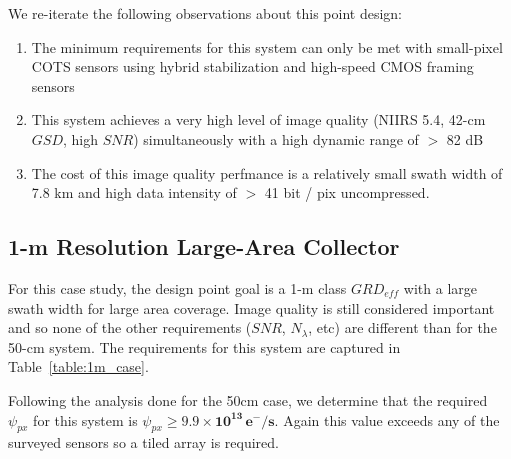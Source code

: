 \documentclass[10pt,journal]{IEEEtran}  %
\begin{document}
We re-iterate the following observations about this point design:

\begin{enumerate}
    \item The minimum requirements for this system can only be met with small-pixel COTS sensors using hybrid stabilization and high-speed CMOS framing sensors
    \item This system achieves a very high level of image quality (NIIRS 5.4, 42-cm $GSD$, high $SNR$) simultaneously with a high dynamic range of $>$ 82 dB
    \item The cost of this image quality perfmance is a relatively small swath width of 7.8 km and high data intensity of $>$ 41 bit / pix uncompressed.
\end{enumerate}

\subsection{1-m Resolution Large-Area Collector}

For this case study, the design point goal is a 1-m class $GRD_{eff}$ with a large swath width for large area coverage.  Image quality is still considered important and so none of the other requirements ($SNR$, $N_\lambda$, etc) are different than for the 50-cm system.  The requirements for this system are captured in Table~\ref{table:1m_case}. 

\begin{table}[h!]
\centering
{}
\caption{Specification for 1-m large-area collector.}
\label{table:1m_case}
\end{table}

Following the analysis done for the 50cm case, we determine that the required $\psi_{px}$ for this system is $\psi_{px} \geq \mathbf{9.9 \times 10^{13} \, e^-/s}$.  Again this value exceeds any of the surveyed sensors so a tiled array is required.  
\end{document}
